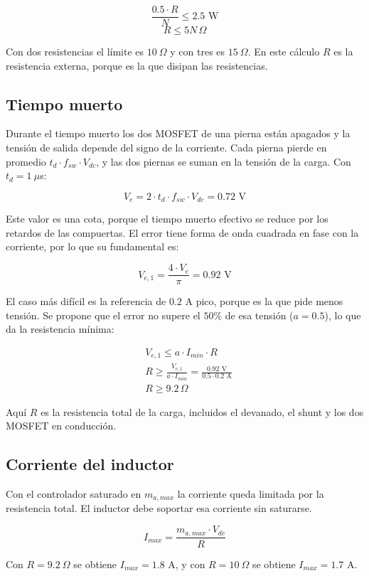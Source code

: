 \documentclass[spanish,10pt,a4paper,titlepage]{article}
\begin{document}
	\[\frac{0.5 \cdot R }{N} \leq 2.5\text{ W}\]
	\[R \leq 5N\, \Omega\]

	Con dos resistencias el límite es $10\ \Omega$ y con tres es $15\ \Omega$. En este cálculo $R$ es la resistencia externa, porque es la que disipan las resistencias.

	\subsection{Tiempo muerto}
	Durante el tiempo muerto los dos MOSFET de una pierna están apagados y la tensión de salida depende del signo de la corriente. Cada pierna pierde en promedio $t_d \cdot f_{sw} \cdot V_{dc}$, y las dos piernas se suman en la tensión de la carga. Con $t_d = 1\ \mu$s:

	\[V_e = 2 \cdot t_d \cdot f_{sw} \cdot V_{dc} = 0.72 \text{ V}\]

	Este valor es una cota, porque el tiempo muerto efectivo se reduce por los retardos de las compuertas. El error tiene forma de onda cuadrada en fase con la corriente, por lo que su fundamental es:

	\[V_{e,1} = \frac{4 \cdot V_e}{\pi} = 0.92 \text{ V}\]

	El caso más difícil es la referencia de $0.2$ A pico, porque es la que pide menos tensión. Se propone que el error no supere el $50\%$ de esa tensión ($a = 0.5$), lo que da la resistencia mínima:

	\begin{align*}
		&V_{e,1} \leq a \cdot I_{min} \cdot R\\
		&R \geq \frac{V_{e,1}}{a \cdot I_{min}} = \frac{0.92 \text{ V}}{0.5 \cdot 0.2 \text{ A}}\\
		&R \geq 9.2\, \Omega
	\end{align*}

	Aquí $R$ es la resistencia total de la carga, incluidos el devanado, el shunt y los dos MOSFET en conducción.

	\subsection{Corriente del inductor}
	Con el controlador saturado en $m_{a,max}$ la corriente queda limitada por la resistencia total. El inductor debe soportar esa corriente sin saturarse.

	\[I_{max} = \frac{m_{a,max} \cdot V_{dc}}{R}\]

	Con $R = 9.2\ \Omega$ se obtiene $I_{max} = 1.8$ A, y con $R = 10\ \Omega$ se obtiene $I_{max} = 1.7$ A.
\end{document}
